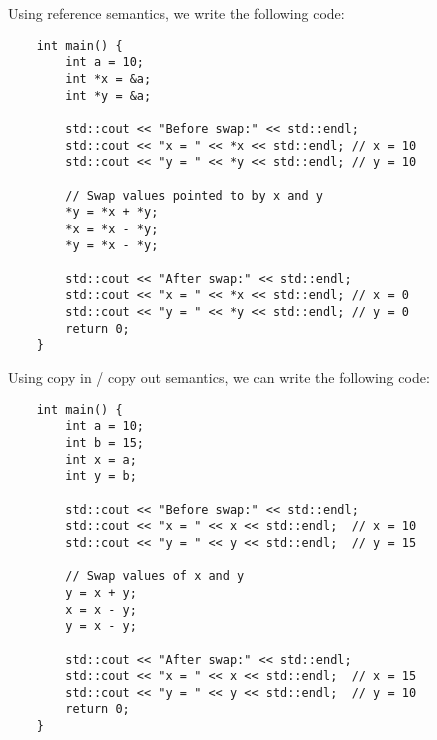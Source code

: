 \documentclass{article}
\begin{document}
    \begin{eg}
        
        Using reference semantics, we write the following code:
        \begin{lstlisting}
    int main() {
        int a = 10;
        int *x = &a;
        int *y = &a;

        std::cout << "Before swap:" << std::endl;
        std::cout << "x = " << *x << std::endl; // x = 10
        std::cout << "y = " << *y << std::endl; // y = 10

        // Swap values pointed to by x and y
        *y = *x + *y;
        *x = *x - *y;
        *y = *x - *y;

        std::cout << "After swap:" << std::endl;
        std::cout << "x = " << *x << std::endl; // x = 0
        std::cout << "y = " << *y << std::endl; // y = 0
        return 0;
    }
        \end{lstlisting}

    Using copy in / copy out semantics, we can write the following code:


    \begin{lstlisting}
    int main() {
        int a = 10;
        int b = 15;
        int x = a;
        int y = b;

        std::cout << "Before swap:" << std::endl;
        std::cout << "x = " << x << std::endl;  // x = 10
        std::cout << "y = " << y << std::endl;  // y = 15

        // Swap values of x and y
        y = x + y;
        x = x - y;
        y = x - y;

        std::cout << "After swap:" << std::endl;
        std::cout << "x = " << x << std::endl;  // x = 15
        std::cout << "y = " << y << std::endl;  // y = 10
        return 0;
    }
    \end{lstlisting}
    \end{eg}
\end{document}
